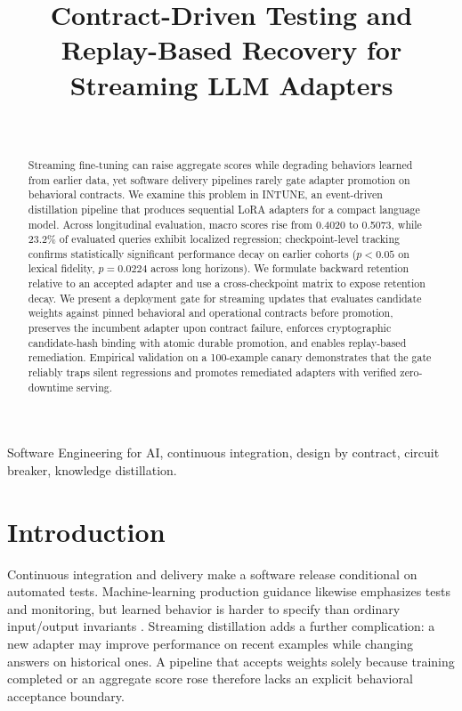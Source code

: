 \documentclass[conference]{IEEEtran}
\title{Contract-Driven Testing and Replay-Based Recovery for Streaming LLM Adapters}
\author{\IEEEauthorblockN{Anonymous Authors}\\
\IEEEauthorblockA{\textit{Affiliation Omitted for Double-Anonymous Review}}}
\begin{document}
\maketitle

\begin{abstract}
Streaming fine-tuning can raise aggregate scores while degrading behaviors learned from earlier data, yet software delivery pipelines rarely gate adapter promotion on behavioral contracts. We examine this problem in INTUNE, an event-driven distillation pipeline that produces sequential LoRA adapters for a compact language model. Across longitudinal evaluation, macro scores rise from 0.4020 to 0.5073, while 23.2\% of evaluated queries exhibit localized regression; checkpoint-level tracking confirms statistically significant performance decay on earlier cohorts ($p < 0.05$ on lexical fidelity, $p = 0.0224$ across long horizons). We formulate backward retention relative to an accepted adapter and use a cross-checkpoint matrix to expose retention decay. We present a deployment gate for streaming updates that evaluates candidate weights against pinned behavioral and operational contracts before promotion, preserves the incumbent adapter upon contract failure, enforces cryptographic candidate-hash binding with atomic durable promotion, and enables replay-based remediation. Empirical validation on a 100-example canary demonstrates that the gate reliably traps silent regressions and promotes remediated adapters with verified zero-downtime serving.
\end{abstract}

\begin{IEEEkeywords}
Software Engineering for AI, continuous integration, design by contract, circuit breaker, knowledge distillation.
\end{IEEEkeywords}

\section{Introduction}
Continuous integration and delivery make a software release conditional on automated tests. Machine-learning production guidance likewise emphasizes tests and monitoring, but learned behavior is harder to specify than ordinary input/output invariants \cite{NIPS2015_86df7dcf,8258038,8804457}. Streaming distillation adds a further complication: a new adapter may improve performance on recent examples while changing answers on historical ones. A pipeline that accepts weights solely because training completed or an aggregate score rose therefore lacks an explicit behavioral acceptance boundary.
\end{document}
